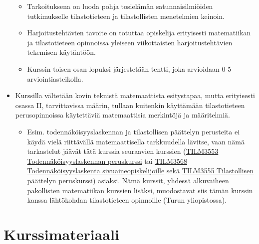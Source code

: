 \documentclass[
]{book}
\providecommand{\tightlist}{%
  \setlength{\itemsep}{0pt}\setlength{\parskip}{0pt}}
\begin{document}
\begin{itemize}
  \begin{itemize}
  \tightlist
  \item
    Tarkoituksena on luoda pohja tosielämän satunnaisilmiöiden tutkimukselle tilastotieteen ja tilastollisten menetelmien keinoin.
  \item
    Harjoitustehtävien tavoite on totuttaa opiskelija erityisesti matematiikan ja tilastotieteen opinnoissa yleiseen viikottaisten harjoitustehtävien tekemisen käytäntöön.
  \item
    Kurssin toisen osan lopuksi järjestetään tentti, joka arvioidaan 0-5 arviointiasteikolla.
  \end{itemize}
\item
  Kurssilla vältetään kovin teknistä matemaattista esitystapaa, mutta erityisesti osassa II, tarvittavissa määrin, tullaan kuitenkin käyttämään tilastotieteen perusopinnoissa käytettäviä matemaattisia merkintöjä ja määritelmiä.

  \begin{itemize}
  \tightlist
  \item
    Esim. todennäköisyyslaskennan ja tilastollisen päättelyn perusteita ei käydä vielä riittävällä matemaattisella tarkkuudella lävitse, vaan nämä tarkastelut jäävät tätä kurssia seuraavien kurssien (\href{https://opas.peppi.utu.fi/fi/opintojakso/TILM3553/1734?period=2022-2024}{TILM3553 Todennäköisyyslaskennan peruskurssi} tai \href{https://opas.peppi.utu.fi/fi/opintojakso/TILM3568/3385?period=2\%20022-2024}{TILM3568 Todennäköisyyslaskenta sivuaineopiskelijoille} sekä \href{https://opas.peppi.utu.fi/fi/opintojakso/TILM3555/1731?period=2022-2024}{TILM3555 Tilastollisen päättelyn peruskurssi}) asiaksi. Nämä kurssit, yhdessä alkuvaiheen pakollisten matematiikan kurssien lisäksi, muodostavat siis tämän kurssin kanssa lähtökohdan tilastotieteen opinnoille (Turun yliopistossa).
  \end{itemize}
\end{itemize}

\hypertarget{kurssimateriaali}{%
\chapter*{Kurssimateriaali}\label{kurssimateriaali}}
\end{document}
